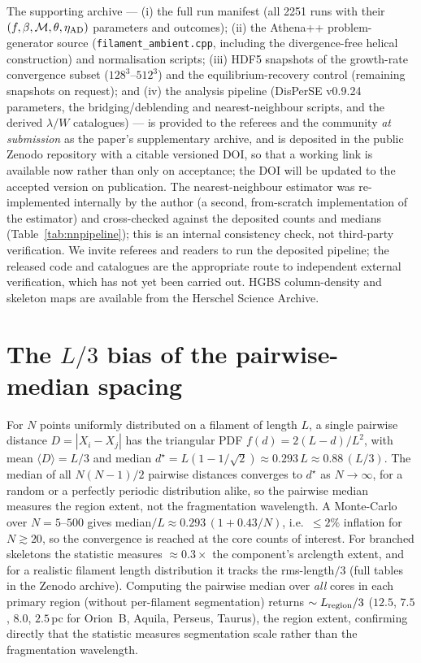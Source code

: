\documentclass[usenatbib,twoside,twocolumn]{mnras}
\begin{document}
The supporting archive --- (i) the full run manifest (all 2251 runs with their $(f,\beta,\mathcal{M},\theta,\eta_{\rm AD})$ parameters and outcomes); (ii) the Athena++ problem-generator source (\texttt{filament\_ambient.cpp}, including the divergence-free helical construction) and normalisation scripts; (iii) HDF5 snapshots of the growth-rate convergence subset ($128^3$--$512^3$) and the equilibrium-recovery control (remaining snapshots on request); and (iv) the analysis pipeline (DisPerSE v0.9.24 parameters, the bridging/deblending and nearest-neighbour scripts, and the derived $\lambda/W$ catalogues) --- is provided to the referees and the community \emph{at submission} as the paper's supplementary archive, and is deposited in the public Zenodo repository with a citable versioned DOI, so that a working link is available now rather than only on acceptance; the DOI will be updated to the accepted version on publication. The nearest-neighbour estimator was re-implemented internally by the author (a second, from-scratch implementation of the estimator) and cross-checked against the deposited counts and medians (Table~\ref{tab:nnpipeline}); this is an internal consistency check, not third-party verification. We invite referees and readers to run the deposited pipeline; the released code and catalogues are the appropriate route to independent external verification, which has not yet been carried out. HGBS column-density and skeleton maps are available from the Herschel Science Archive.


\appendix

\section{The $L/3$ bias of the pairwise-median spacing}
\label{sec:pwmedian}
For $N$ points uniformly distributed on a filament of length $L$, a single pairwise distance $D=|X_i-X_j|$ has the triangular PDF $f(d)=2(L-d)/L^2$, with mean $\langle D\rangle=L/3$ and median $d^\star=L(1-1/\sqrt{2})\approx0.293\,L\approx0.88\,(L/3)$. The median of all $N(N-1)/2$ pairwise distances converges to $d^\star$ as $N\to\infty$, for a random or a perfectly periodic distribution alike, so the pairwise median measures the region extent, not the fragmentation wavelength. A Monte-Carlo over $N=5$--$500$ gives median$/L\approx0.293\,(1+0.43/N)$, i.e.\ $\le2\%$ inflation for $N\gtrsim20$, so the convergence is reached at the core counts of interest. For branched skeletons the statistic measures $\approx0.3\times$ the component's arclength extent, and for a realistic filament length distribution it tracks the rms-length$/3$ (full tables in the Zenodo archive). Computing the pairwise median over \emph{all} cores in each primary region (without per-filament segmentation) returns $\sim L_{\rm region}/3$ ($12.5$, $7.5$, $8.0$, $2.5$\,pc for Orion~B, Aquila, Perseus, Taurus), the region extent, confirming directly that the statistic measures segmentation scale rather than the fragmentation wavelength.
\end{document}
